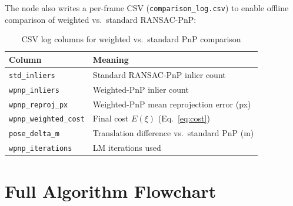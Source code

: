 \documentclass[12pt,a4paper]{article}
\begin{document}
The node also writes a per-frame CSV (\texttt{comparison\_log.csv}) to enable
offline comparison of weighted vs.\ standard RANSAC-PnP:

\begin{table}[H]
\centering
\caption{CSV log columns for weighted vs.\ standard PnP comparison}
\begin{tabular}{ll}
\toprule
Column & Meaning \\
\midrule
\texttt{std\_inliers}         & Standard RANSAC-PnP inlier count \\
\texttt{wpnp\_inliers}        & Weighted-PnP inlier count \\
\texttt{wpnp\_reproj\_px}     & Weighted-PnP mean reprojection error (px) \\
\texttt{wpnp\_weighted\_cost} & Final cost $E(\xi)$ (Eq.~\ref{eq:cost}) \\
\texttt{pose\_delta\_m}       & Translation difference vs.\ standard PnP (m) \\
\texttt{wpnp\_iterations}     & LM iterations used \\
\bottomrule
\end{tabular}
\end{table}

\section{Full Algorithm Flowchart}
\end{document}

